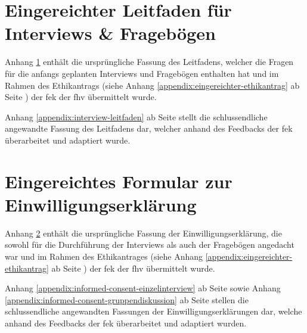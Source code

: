 \documentclass[a4paper,12pt,twoside]{scrreprt}
\begin{document}
\cleardoublepage
\chapter{Eingereichter Leitfaden für Interviews \& Fragebögen}
\label{appendix:ursprünglicher-leitfaden}

Anhang \ref{appendix:ursprünglicher-leitfaden} enthält die ursprüngliche Fassung des Leitfadens, welcher die Fragen für die anfangs geplanten Interviews und Fragebögen enthalten hat und im Rahmen des Ethikantrags (siehe Anhang \ref{appendix:eingereichter-ethikantrag} ab Seite \pageref{appendix:eingereichter-ethikantrag}) der \acl{fek} der \acl{fhv} übermittelt wurde.

\medskip

Anhang \ref{appendix:interview-leitfaden} ab Seite \pageref{appendix:interview-leitfaden} stellt die schlussendliche angewandte Fassung des Leitfadens dar, welcher anhand des Feedbacks der \ac{fek} überarbeitet und adaptiert wurde.



\cleardoublepage
\chapter{Eingereichtes Formular zur Einwilligungserklärung}
\label{appendix:ursprüngliches-informed-consent-formular}

Anhang \ref{appendix:ursprüngliches-informed-consent-formular} enthält die ursprüngliche Fassung der Einwilligungserklärung, die sowohl für die Durchführung der Interviews als auch der Fragebögen angedacht war und im Rahmen des Ethikantrages (siehe Anhang \ref{appendix:eingereichter-ethikantrag} ab Seite \pageref{appendix:eingereichter-ethikantrag}) der \acl{fek} der \acl{fhv} übermittelt wurde.

\medskip

Anhang \ref{appendix:informed-consent-einzelinterview} ab Seite \pageref{appendix:informed-consent-einzelinterview} sowie Anhang \ref{appendix:informed-consent-gruppendiskussion} ab Seite \pageref{appendix:informed-consent-gruppendiskussion} stellen die schlussendliche angewandten Fassungen der Einwilligungserklärungen dar, welche anhand des Feedbacks der \ac{fek} überarbeitet und adaptiert wurden.



\cleardoublepage
\end{document}
